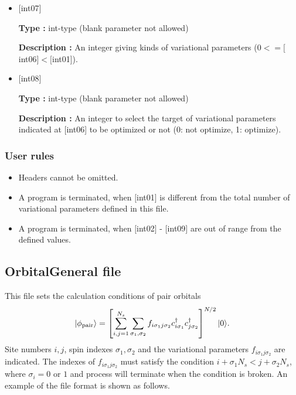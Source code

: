 \begin{itemize}
  {\bf Description :} When the mode of the anti-periodic condition turns on (the mode turns on when the value of \verb|NMPTrans| in \verb|ModPara| file is negative), the sign of $f_{ij}$ is specified by setting $[$int06$]=\pm1$. This term can be omitted when the mode of the anti-periodic condition is off.

 \item  $[$int07$]$
   
   {\bf Type :} int-type (blank parameter not allowed)

  {\bf Description :} An integer giving kinds of variational  parameters ($0<= [$int06$]<[$int01]).   
 \item  $[$int08$]$
   
   {\bf Type :} int-type (blank parameter not allowed)

  {\bf Description :} An integer to select the target of variational parameters indicated at [int06] to be optimized or not (0: not optimize, 1: optimize).
  
  
\end{itemize}

\subsubsection{User rules}
\begin{itemize}
\item Headers cannot be omitted. 
\item A program is terminated, when $[$int01$]$ is different from the total number of variational parameters defined in this file.
\item A program is terminated, when $[$int02$]$ - $[$int09$]$ are out of range from the defined values.
\end{itemize}


\newpage
\subsection{OrbitalGeneral file}
\label{Subsec:OrbitalaGeneral}
This file sets the calculation conditions of pair orbitals
\begin{equation}
|\phi_{\rm pair} \rangle = \left[\sum_{i, j=1}^{N_s} \sum_{\sigma_1, \sigma_2}f_{i\sigma_1j\sigma_2}c_{i\sigma_1}^{\dag}c_{j\sigma_2}^{\dag} \right]^{N/2}|0 \rangle.
\end{equation}
Site numbers $i, j$, spin indexes $\sigma_1, \sigma_2$ and the variational parameters $f_{i\sigma_1j\sigma_2}$ are indicated.
The indexes of $f_{i\sigma_1j\sigma_2}$  must satisfy the condition $i+\sigma_1 N_s < j+\sigma_2 N_s$, where $\sigma_i = 0$ or $1$ and 
process will terminate when the condition is broken.
An example of the file format is shown as follows.

